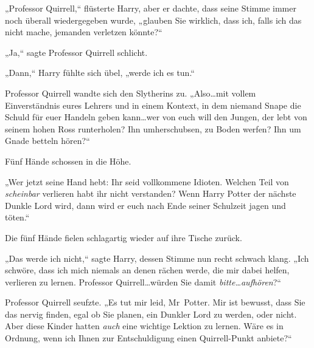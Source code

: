 „Professor Quirrell,“ flüsterte Harry, aber er dachte, dass seine Stimme immer noch überall wiedergegeben wurde, „glauben Sie wirklich, dass ich, falls ich das nicht mache, jemanden verletzen könnte?“

„Ja,“ sagte Professor Quirrell schlicht.

„Dann,“ Harry fühlte sich übel, „werde ich es tun.“

Professor Quirrell wandte sich den Slytherins zu. „Also…mit vollem Einverständnis eures Lehrers und in einem Kontext, in dem niemand Snape die Schuld für euer Handeln geben kann…wer von euch will den Jungen, der lebt von seinem hohen Ross runterholen? Ihn umherschubsen, zu Boden werfen? Ihn um Gnade betteln hören?“

Fünf Hände schossen in die Höhe.

„Wer jetzt seine Hand hebt: Ihr seid vollkommene Idioten. Welchen Teil von \emph{scheinbar} verlieren habt ihr nicht verstanden? Wenn Harry Potter der nächste Dunkle Lord wird, dann wird er euch nach Ende seiner Schulzeit jagen und töten.“

Die fünf Hände fielen schlagartig wieder auf ihre Tische zurück.

„Das werde ich nicht,“ sagte Harry, dessen Stimme nun recht schwach klang. „Ich schwöre, dass ich mich niemals an denen rächen werde, die mir dabei helfen, verlieren zu lernen. Professor Quirrell…würden Sie damit \emph{bitte…aufhören}?“

Professor Quirrell seufzte. „Es tut mir leid, Mr~Potter. Mir ist bewusst, dass Sie das nervig finden, egal ob Sie planen, ein Dunkler Lord zu werden, oder nicht. Aber diese Kinder hatten \emph{auch} eine wichtige Lektion zu lernen. Wäre es in Ordnung, wenn ich Ihnen zur Entschuldigung einen Quirrell-Punkt anbiete?“

